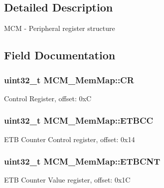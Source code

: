 \subsection{Detailed Description}
M\+C\+M -\/ Peripheral register structure 

\subsection{Field Documentation}
\hypertarget{struct_m_c_m___mem_map_a7bc89132595b7fb75318b4ba285957cd}{}
\subsubsection[{C\+R}]{\setlength{\rightskip}{0pt plus 5cm}uint32\+\_\+t M\+C\+M\+\_\+\+Mem\+Map\+::\+C\+R}\label{struct_m_c_m___mem_map_a7bc89132595b7fb75318b4ba285957cd}
Control Register, offset\+: 0x\+C \hypertarget{struct_m_c_m___mem_map_a2d99ca168bd0840c724da29daca2c355}{}
\subsubsection[{E\+T\+B\+C\+C}]{\setlength{\rightskip}{0pt plus 5cm}uint32\+\_\+t M\+C\+M\+\_\+\+Mem\+Map\+::\+E\+T\+B\+C\+C}\label{struct_m_c_m___mem_map_a2d99ca168bd0840c724da29daca2c355}
E\+T\+B Counter Control register, offset\+: 0x14 \hypertarget{struct_m_c_m___mem_map_adfc2ce9910687ae02d33cb7a1584a919}{}
\subsubsection[{E\+T\+B\+C\+N\+T}]{\setlength{\rightskip}{0pt plus 5cm}uint32\+\_\+t M\+C\+M\+\_\+\+Mem\+Map\+::\+E\+T\+B\+C\+N\+T}\label{struct_m_c_m___mem_map_adfc2ce9910687ae02d33cb7a1584a919}
E\+T\+B Counter Value register, offset\+: 0x1\+C \hypertarget{struct_m_c_m___mem_map_ae4d8c3979038482e324840c3bfa856d7}{}
